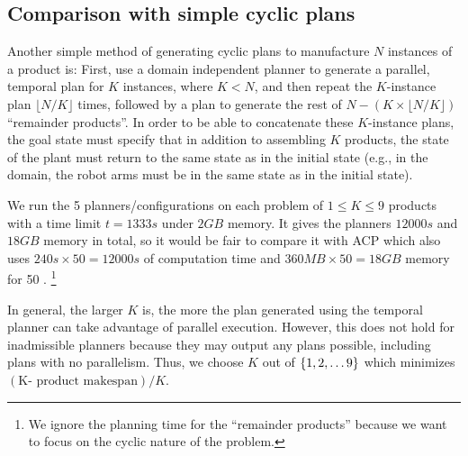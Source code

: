 
\subsection{Comparison with simple cyclic plans}
\label{tcp}

Another simple method of generating cyclic plans to manufacture $N$ instances
of a product is: First, use a domain independent planner to generate a
parallel, temporal plan for $K$ instances, where $K < N$, and then repeat
the $K$-instance plan $\lfloor N/K \rfloor$ times,
followed by a plan to generate the rest of $N - (K \times \lfloor N/K \rfloor)$ ``remainder products''.
In order to be able to concatenate
these $K$-instance plans, the goal state must specify that in addition
to assembling $K$ products, the state of the plant must return to the
same state as in the initial state (e.g., in the \ca domain, the robot
  arms must be in the same state as in the initial state).

We run the 5 planners/configurations on each problem of $1\leq K \leq 9$ products
with a time limit $t=1333\si{s}$ under $2\si{GB}$ memory.
It gives the planners $12000\si{s}$ and $18\si{GB}$ memory in total,
so it would be fair to compare it with ACP
which also uses $240\si{s}\times 50 = 12000\si{s}$ of computation time and
 $360\si{MB}\times 50 = 18\si{GB}$ memory for 50 \sss.
\footnote{We ignore the planning time for the ``remainder products''
because we want to focus on the cyclic nature of the problem.}

In general, the larger $K$ is, the more the plan generated using the temporal planner can take advantage of parallel execution.
However, this does not hold for inadmissible planners because they may output any plans possible, including plans with no parallelism.
Thus, we choose $K$ out of $\left\{1,2,\ldots 9\right\}$ which minimizes $(\mbox{K- product makespan})/K$.


